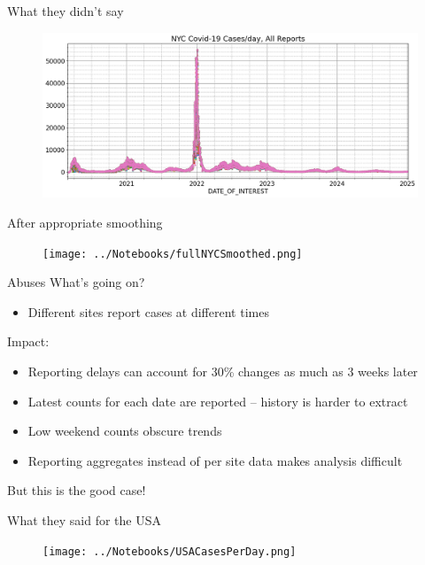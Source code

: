 \documentclass[aspectratio=169]{beamer}
\begin{document}
\begin{frame}{What they didn't say}
  \begin{figure}
    \centering
    \includegraphics[width=1\textwidth]{../Notebooks/theFullStory.png}
  \end{figure}
\end{frame}

\begin{frame}{After appropriate smoothing}
  \begin{figure}
    \centering
    \texttt{[image: ../Notebooks/fullNYCSmoothed.png]}
  \end{figure}

\end{frame}

\begin{frame}{Abuses}
  What's going on?
  \begin{itemize}
  \item Different sites report cases at different times
  \end{itemize}
  
  Impact:
  \begin{itemize}
  \item Reporting delays can account for 30\% changes as much as 3
    weeks later
  \item Latest counts for each date are reported -- history is harder
    to extract
  \item Low weekend counts obscure trends
  \item Reporting aggregates instead of per site data makes analysis difficult
  \end{itemize}

But this is the good case!
\end{frame}


\begin{frame}{What they said for the USA}
  \begin{figure}
    \centering
    \texttt{[image: ../Notebooks/USACasesPerDay.png]}
  \end{figure}
\end{frame}
\end{document}
